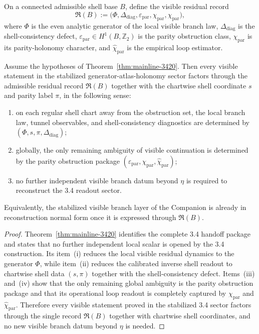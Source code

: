 \begin{definition}
\label{def:mainline-3500}
On a connected admissible shell base $B$, define the visible residual record
\[
  \mathfrak R(B)
  :=
  \bigl(\Phi,\Delta_{\mathrm{diag}},\varepsilon_{\mathrm{par}},\chi_{\mathrm{par}},\widehat\chi_{\mathrm{par}}\bigr),
\]
where $\Phi$ is the even analytic generator of the local visible branch law, $\Delta_{\mathrm{diag}}$ is the shell-consistency defect, $\varepsilon_{\mathrm{par}}\in H^1(B,\mathbb Z_2)$ is the parity obstruction class, $\chi_{\mathrm{par}}$ is its parity-holonomy character, and $\widehat\chi_{\mathrm{par}}$ is the empirical loop estimator.
\end{definition}

\begin{theorem}
\label{thm:mainline-3500}
Assume the hypotheses of Theorem~\ref{thm:mainline-3420}. Then every visible statement in the stabilized generator-atlas-holonomy sector factors through the admissible residual record $\mathfrak R(B)$ together with the chartwise shell coordinate $s$ and parity label $\pi$, in the following sense:
\begin{enumerate}[label=(\roman*), leftmargin=2em]
  \item on each regular shell chart away from the obstruction set, the local branch law, tunnel observables, and shell-consistency diagnostics are determined by $(\Phi,s,\pi,\Delta_{\mathrm{diag}})$;
  \item globally, the only remaining ambiguity of visible continuation is determined by the parity obstruction package $(\varepsilon_{\mathrm{par}},\chi_{\mathrm{par}},\widehat\chi_{\mathrm{par}})$;
  \item no further independent visible branch datum beyond $\eta$ is required to reconstruct the 3.4 readout sector.
\end{enumerate}
Equivalently, the stabilized visible branch layer of the Companion is already in reconstruction normal form once it is expressed through $\mathfrak R(B)$.
\end{theorem}

\begin{proof}
Theorem~\ref{thm:mainline-3420} identifies the complete 3.4 handoff package and states that no further independent local scalar is opened by the 3.4 construction. Its item~(i) reduces the local visible residual dynamics to the generator $\Phi$, while item~(ii) reduces the calibrated inverse shell readout to chartwise shell data $(s,\pi)$ together with the shell-consistency defect. Items~(iii) and~(iv) show that the only remaining global ambiguity is the parity obstruction package and that its operational loop readout is completely captured by $\chi_{\mathrm{par}}$ and $\widehat\chi_{\mathrm{par}}$. Therefore every visible statement proved in the stabilized 3.4 sector factors through the single record $\mathfrak R(B)$ together with chartwise shell coordinates, and no new visible branch datum beyond $\eta$ is needed.
\end{proof}


